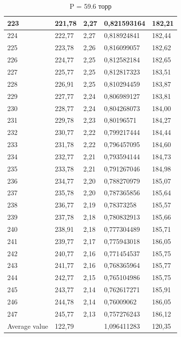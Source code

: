 \documentclass[a4paper, 10pt, twocolumn]{article}
\begin{document}
{\begin{table}[]
\begin{tabular}{|l|l|l|l|l|}
    223           & 221,78 & 2,27   & 0,821593164 & 182,21      \\ \hline
    224           & 222,77 & 2,27   & 0,818924841 & 182,44      \\ \hline
    225           & 223,78 & 2,26   & 0,816099057 & 182,62      \\ \hline
    226           & 224,77 & 2,25   & 0,812582184 & 182,65      \\ \hline
    227           & 225,77 & 2,25   & 0,812817323 & 183,51      \\ \hline
    228           & 226,91 & 2,25   & 0,810294459 & 183,87      \\ \hline
    229           & 227,77 & 2,24   & 0,806989127 & 183,81      \\ \hline
    230           & 228,77 & 2,24   & 0,804268073 & 184,00      \\ \hline
    231           & 229,78 & 2,23   & 0,80196571  & 184,27      \\ \hline
    232           & 230,77 & 2,22   & 0,799217444 & 184,44      \\ \hline
    233           & 231,78 & 2,22   & 0,796457095 & 184,60      \\ \hline
    234           & 232,77 & 2,21   & 0,793594144 & 184,73      \\ \hline
    235           & 233,78 & 2,21   & 0,791267046 & 184,98      \\ \hline
    236           & 234,77 & 2,20   & 0,788270979 & 185,07      \\ \hline
    237           & 235,78 & 2,20   & 0,787365856 & 185,64      \\ \hline
    238           & 236,77 & 2,19   & 0,78373258  & 185,57      \\ \hline
    239           & 237,78 & 2,18   & 0,780832913 & 185,66      \\ \hline
    240           & 238,91 & 2,18   & 0,777304489 & 185,71      \\ \hline
    241           & 239,77 & 2,17   & 0,775943018 & 186,05      \\ \hline
    242           & 240,77 & 2,16   & 0,771454537 & 185,75      \\ \hline
    243           & 241,77 & 2,16   & 0,768365964 & 185,77      \\ \hline
    244           & 242,77 & 2,15   & 0,765104986 & 185,75      \\ \hline
    245           & 243,77 & 2,14   & 0,762617271 & 185,91      \\ \hline
    246           & 244,78 & 2,14   & 0,76009062  & 186,05      \\ \hline
    247           & 245,77 & 2,13   & 0,757276243 & 186,12      \\ \hline
    Average value & 122,79 &        & 1,096411283 & 120,35      \\ \hline
    \end{tabular}
    \caption{P = 59.6 торр}
    \end{table}
}
 
\end{document}
